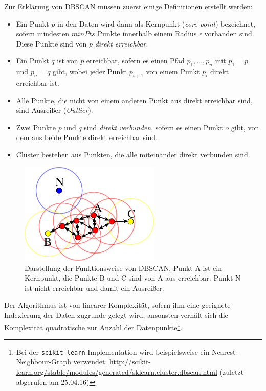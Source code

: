 Zur Erklärung von DBSCAN müssen zuerst einige Definitionen erstellt werden:
\begin{itemize}
  \item Ein Punkt $p$ in den Daten wird dann als
  Kernpunkt (\emph{core point}) bezeichnet, sofern mindesten $minPts$ Punkte innerhalb einem Radius $\epsilon$ vorhanden sind.\\
  Diese Punkte sind von $p$ \emph{direkt erreichbar}.
  \item Ein Punkt $q$ ist von $p$ erreichbar, sofern es einen Pfad $p_1, \ldots, p_n$ mit $p_1 = p$ und $p_n = q$ gibt, wobei
  jeder Punkt $p_{i+1}$ von einem Punkt $p_i$ direkt erreichbar ist.
  \item Alle Punkte, die nicht von einem anderen Punkt aus direkt erreichbar sind, sind Ausreißer (\emph{Outlier}).
  \item Zwei Punkte $p$ und $q$ sind \emph{direkt verbunden}, sofern es einen Punkt $o$ gibt,
  von dem aus beide Punkte direkt erreichbar sind.
  \item Cluster bestehen aus Punkten, die alle miteinander direkt verbunden sind.
\end{itemize}

\begin{figure}[h]
  \centering
  \includegraphics[width=0.6\textwidth]{../img/DBSCAN-Illustration.png}
  \caption[Darstellung der Funktionsweise von DBSCAN]{Darstellung der Funktionsweise von DBSCAN. Punkt A ist ein Kernpunkt, die
  Punkte B und C sind von A aus erreichbar. Punkt N ist nicht erreichbar und damit ein Ausreißer.\footnotemark}
\end{figure}

Der Algorithmus ist von linearer Komplexität, sofern ihm eine geeignete Indexierung der Daten zugrunde gelegt wird, ansonsten
verhält sich die Komplexität quadratische zur Anzahl der Datenpunkte\footnote{Bei der
\verb|scikit-learn|-Implementation wird beispielsweise ein Nearest-Neighbour-Graph verwendet:
\url{http://scikit-learn.org/stable/modules/generated/sklearn.cluster.dbscan.html} (zuletzt abgerufen am 25.04.16)}.

